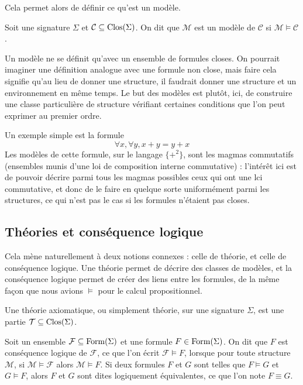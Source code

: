 Cela permet alors de définir ce qu'est un modèle.

\begin{definition}[Modèle]
  Soit une signature $\Sigma$ et $\mathcal C\subseteq\operatorname{Clos}(\Sigma)$. On dit que
  $\mathcal M$ est un modèle de $\mathcal C$ si $\mathcal M\models \mathcal C$.
\end{definition}

Un modèle ne se définit qu'avec un ensemble de formules closes. On pourrait
imaginer une définition analogue avec une formule non close, mais faire cela
signifie qu'au lieu de donner une structure, il faudrait donner une structure et
un environnement en même temps. Le but des modèles est plutôt, ici, de
construire une classe particulière de structure vérifiant certaines conditions
que l'on peut exprimer au premier ordre.

Un exemple simple est la formule
\[\forall x,\forall y, x + y = y + x\]
Les modèles de cette formule, sur le langage $\{+^2\}$, sont les magmas
commutatifs (ensembles munis d'une loi de composition interne commutative) :
l'intérêt ici est de pouvoir décrire parmi tous les magmas possibles ceux qui
ont une lci commutative, et donc de le faire en quelque sorte uniformément parmi
les structures, ce qui n'est pas le cas si les formules n'étaient pas closes.

\subsection{Théories et conséquence logique}

Cela mène naturellement à deux notions connexes : celle de théorie, et celle
de conséquence logique. Une théorie permet de décrire des classes de modèles, et
la conséquence logique permet de créer des liens entre les formules, de la même
façon que nous avions $\vDash$ pour le calcul propositionnel.

\begin{definition}[Théorie]
  Une théorie axiomatique, ou simplement théorie, sur une signature $\Sigma$,
  est une partie $\mathcal T\subseteq\operatorname{Clos}(\Sigma)$.
\end{definition}

\begin{definition}
  Soit un ensemble $\mathcal F \subseteq \operatorname{Form}(\Sigma)$ et une formule
  $F\in\operatorname{Form}(\Sigma)$. On dit que $F$ est conséquence logique de
  $\mathcal F$, ce que l'on écrit $\mathcal F \vDash F$, lorsque pour toute
  structure $\mathcal M$, si $\mathcal M\models \mathcal F$ alors
  $\mathcal M\models F$. Si deux formules $F$ et $G$ sont telles que
  $F\vDash G$ et $G\vDash F$, alors $F$ et $G$ sont dites logiquement
  équivalentes, ce que l'on note $F\equiv G$.
\end{definition}

